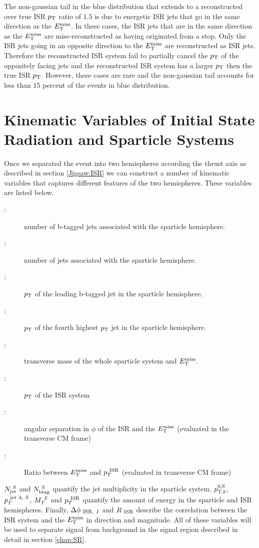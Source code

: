 The non-gaussian tail in the blue distribution that extends to a reconstructed over true ISR $p_{\mathrm{T}}$ ratio of $1.5$ is due to energetic ISR jets that go in the same direction as the $E_{\mathrm{T}}^{\mathrm{miss}}$.  In these cases, the ISR jets that are in the same direction as the $E_{\mathrm{T}}^{\mathrm{miss}}$ are miss-reconstructed as having originated from a stop.  Only the ISR jets going in an opposite direction to the $E_{\mathrm{T}}^{\mathrm{miss}}$ are reconstructed as ISR jets.  Therefore the reconstructed ISR system fail to partially cancel the $p_{\mathrm{T}}$ of the oppositely facing jets and the reconstructed ISR system has a larger $p_{\mathrm{T}}$ then the true ISR $p_{\mathrm{T}}$.  However, these cases are rare and the non-gaussian tail accounts for less than $15$ percent of the events in blue distribution. \\

\section{Kinematic Variables of Initial State Radiation and Sparticle Systems}
\label{Jigsaw:Variables}

\indent Once we separated the event into two hemispheres according the thrust axis as described in section \ref{Jigsaw:ISR} we can construct a number of kinematic variables that captures different features of the two hemispheres.  These variables are listed below. \\

\begin{description}
\item [\boldmath \NbV:] number of b-tagged jets associated with the sparticle hemisphere.
\item [\boldmath \NjV:] number of jets associated with the sparticle hemisphere.
\item [\boldmath \pTSBZero:] $p_{\mathrm{T}}$ of the leading b-tagged jet in the sparticle hemisphere.
\item [\boldmath \pTjV:] $p_{\mathrm{T}}$ of the fourth highest $p_{\mathrm{T}}$ jet in the sparticle hemisphere.
\item [\boldmath \MS:] transverse mass of the whole sparticle system and $E_{\mathrm{T}}^{\mathrm{miss}}$.
\item [\boldmath \PTISR:] $p_{\mathrm{T}}$ of the ISR system
\item [\boldmath \dphiISRI:] angular separation in $\phi$ of the ISR and the $E_{\mathrm{T}}^{\mathrm{miss}}$ (evaluated in the transverse CM frame)
\item [\boldmath \RISR:] Ratio between $E_{\mathrm{T}}^{\mathrm{miss}}$ and $p_{T}^{~\mathrm{ISR}}$ (evaluated in transverse CM frame)
\end{description}

\indent $N_{\mathrm{jet}}^{~\mathrm{S}}$ and $N_{\mathrm{btag}}^{~\mathrm{S}}$ quantify the jet multiplicity in the sparticle system.  $p_{\mathrm{T},b}^{0,\mathrm{S}}$, $p_{T}^{~\mathrm{jet~4,~S}}$, $M_{T}^{~S}$ and $p_{T}^{~\mathrm{ISR}}$ quantify the amount of energy in the sparticle and ISR hemispheres.  Finally, $\Delta\phi_{~\mathrm{ISR},~I}$ and $R_{~\mathrm{ISR}}$ describe the correlation between the ISR system and the $E_{\mathrm{T}}^{\mathrm{miss}}$ in direction and magnitude.  All of these variables will be used to separate signal from background in the signal region described in detail in section \ref{chap:SR}. \\

